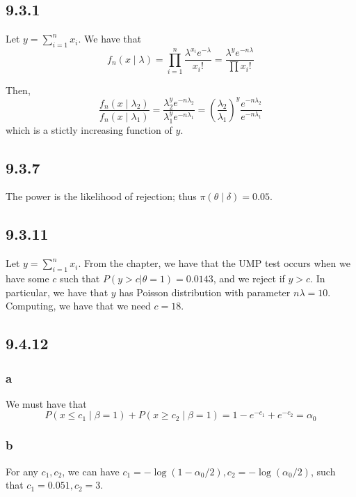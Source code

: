 \documentclass[12pt,letterpaper]{article}
\theoremstyle{definition}
\begin{document}
\subsection*{9.3.1}

Let $y = \sum_{i=1}^nx_i$.
We have that
\[
  f_n(x \mid \lambda) = \prod_{i=1}^n\frac{\lambda^{x_i}e^{-\lambda}}{x_i!} =
  \frac{\lambda^ye^{-n\lambda}}{\prod x_i!}
\]

Then,
\[
  \frac{f_n(x \mid \lambda_2)}{f_n(x\mid\lambda_1)} =
  \frac{\lambda_2^ye^{-n\lambda_2}}{\lambda_1^ye^{-n\lambda_1}} = \left( \frac{\lambda_2}{\lambda_1} \right)^y\frac{e^{-n\lambda_2}}{e^{-n\lambda_1}}
\]
which is a stictly increasing function of $y$.

\subsection*{9.3.7}

The power is the likelihood of rejection; thus $\pi(\theta \mid \delta) = 0.05$.

\subsection*{9.3.11}

Let $y = \sum_{i=1}^nx_i$.
From the chapter, we have that the UMP test occurs when we have some $c$ such
that $P(y > c|\theta = 1) = 0.0143$, and we reject if $y > c$. In particular, we have that
$y$ has Poisson distribution with parameter $n\lambda = 10$. Computing, we have
that we need $c = 18$.

\subsection*{9.4.12}

\subsubsection*{a}

We must have that
\[
  P(x \leq c_1 \mid \beta = 1) + P(x \geq c_2 \mid \beta = 1) = 1 - e^{-c_1} + e^{-c_2} = \alpha_0
\]

\subsubsection*{b}

For any $c_1, c_2$, we can have $c_1 = -\log(1 - \alpha_0/2), c_2 =
-\log(\alpha_0/2)$, such that $c_1 = 0.051, c_2 = 3$.
\end{document}

